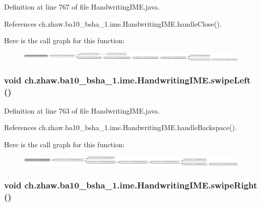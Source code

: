 Definition at line 767 of file HandwritingIME.java.

References ch.zhaw.ba10\_\-bsha\_\-1.ime.HandwritingIME.handleClose().

Here is the call graph for this function:\nopagebreak
\begin{figure}[H]
\begin{center}
\leavevmode
\includegraphics[width=420pt]{classch_1_1zhaw_1_1ba10__bsha__1_1_1ime_1_1HandwritingIME_aa35f0cbc95d0b5623c29229e3a8ee2e5_cgraph}
\end{center}
\end{figure}
\hypertarget{classch_1_1zhaw_1_1ba10__bsha__1_1_1ime_1_1HandwritingIME_aab0d09eae40077fbdb87a21566a266ea}{
\subsubsection[{swipeLeft}]{\setlength{\rightskip}{0pt plus 5cm}void ch.zhaw.ba10\_\-bsha\_\-1.ime.HandwritingIME.swipeLeft ()}}
\label{classch_1_1zhaw_1_1ba10__bsha__1_1_1ime_1_1HandwritingIME_aab0d09eae40077fbdb87a21566a266ea}


Definition at line 763 of file HandwritingIME.java.

References ch.zhaw.ba10\_\-bsha\_\-1.ime.HandwritingIME.handleBackspace().

Here is the call graph for this function:\nopagebreak
\begin{figure}[H]
\begin{center}
\leavevmode
\includegraphics[width=420pt]{classch_1_1zhaw_1_1ba10__bsha__1_1_1ime_1_1HandwritingIME_aab0d09eae40077fbdb87a21566a266ea_cgraph}
\end{center}
\end{figure}
\hypertarget{classch_1_1zhaw_1_1ba10__bsha__1_1_1ime_1_1HandwritingIME_a5a27dd14331c21af3031ffcd38d802f4}{
\subsubsection[{swipeRight}]{\setlength{\rightskip}{0pt plus 5cm}void ch.zhaw.ba10\_\-bsha\_\-1.ime.HandwritingIME.swipeRight ()}}
\label{classch_1_1zhaw_1_1ba10__bsha__1_1_1ime_1_1HandwritingIME_a5a27dd14331c21af3031ffcd38d802f4}


